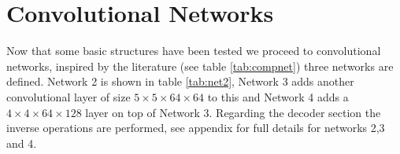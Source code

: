 
  \newpage
  \section{Convolutional Networks}

    Now that some basic structures have been tested we proceed to convolutional networks,
    inspired by the literature (see table \ref{tab:compnet}) three networks are defined.
    Network 2 is shown in table \ref{tab:net2}, Network 3
    adds another convolutional layer of size $5\times 5 \times 64 \times 64$ to this and
    Network 4 adds a $4\times 4 \times 64 \times 128$ layer
    on top of Network 3. Regarding the decoder section the inverse operations are
    performed, see appendix \label{appendix1} for full details
    for networks 2,3 and 4.


